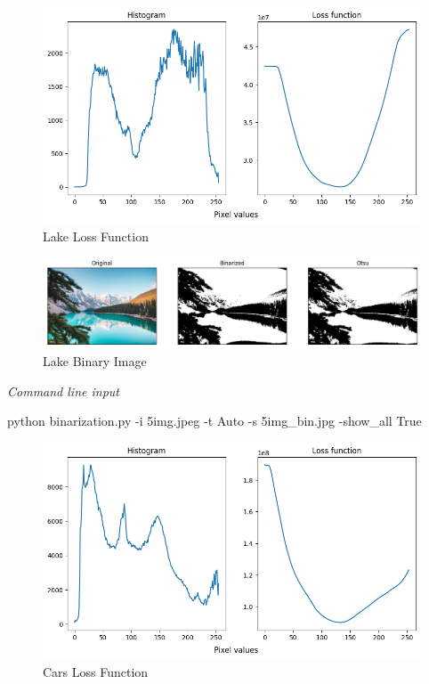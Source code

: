\begin{multicols}{2}
\begin{figure}[H]
    \centering
    \includegraphics[width=0.98\columnwidth]{../Images/examples/lake_loss.png}
    \caption{Lake Loss Function}
    \label{fig-1}
\end{figure}

\begin{figure}[H]
    \centering
    \includegraphics[width=0.98\columnwidth]{../Images/examples/lake_bin.png}
    \caption{Lake Binary Image}
    \label{fig-2}
\end{figure}

\noindent
\textit{Command line input}

\begin{bashscript}
    python binarization.py -i 5img.jpeg -t Auto -s 5img_bin.jpg -show_all True
\end{bashscript}
\begin{figure}[H]
    \centering
    \includegraphics[width=0.98\columnwidth]{../Images/examples/cars_loss.png}
    \caption{Cars Loss Function}
    \label{fig-3}
\end{figure}


\end{multicols}
